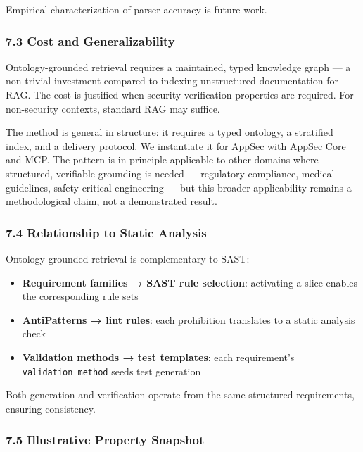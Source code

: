 \documentclass[
]{article}
\providecommand{\tightlist}{%
  \setlength{\itemsep}{0pt}\setlength{\parskip}{0pt}}
\begin{document}
Empirical characterization of parser accuracy is future work.

\subsubsection{7.3 Cost and
Generalizability}\label{cost-and-generalizability}

Ontology-grounded retrieval requires a maintained, typed knowledge graph
--- a non-trivial investment compared to indexing unstructured
documentation for RAG. The cost is justified when security verification
properties are required. For non-security contexts, standard RAG may
suffice.

The method is general in structure: it requires a typed ontology, a
stratified index, and a delivery protocol. We instantiate it for AppSec
with AppSec Core and MCP. The pattern is in principle applicable to
other domains where structured, verifiable grounding is needed ---
regulatory compliance, medical guidelines, safety-critical engineering
--- but this broader applicability remains a methodological claim, not a
demonstrated result.

\subsubsection{7.4 Relationship to Static
Analysis}\label{relationship-to-static-analysis}

Ontology-grounded retrieval is complementary to SAST:

\begin{itemize}
\tightlist
\item
  \textbf{Requirement families → SAST rule selection}: activating a
  slice enables the corresponding rule sets
\item
  \textbf{AntiPatterns → lint rules}: each prohibition translates to a
  static analysis check
\item
  \textbf{Validation methods → test templates}: each requirement's
  \texttt{validation\_method} seeds test generation
\end{itemize}

Both generation and verification operate from the same structured
requirements, ensuring consistency.

\subsubsection{7.5 Illustrative Property
Snapshot}\label{illustrative-property-snapshot}
\end{document}
